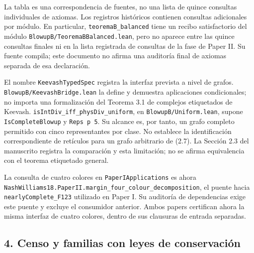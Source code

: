 \documentclass[spanish,11pt,a4paper]{article}
\begin{document}
La tabla es una correspondencia de fuentes, no una lista de quince consultas individuales de axiomas. Los registros históricos contienen consultas adicionales por módulo. En particular, \texttt{teorema\allowbreak{}B\_\allowbreak{}bal\allowbreak{}anced} tiene un recibo satisfactorio del módulo \texttt{Blowup\allowbreak{}B/\allowbreak{}Teor\allowbreak{}ema\allowbreak{}BBalanced\allowbreak{}.\allowbreak{}lean}, pero no aparece entre las quince consultas finales ni en la lista registrada de consultas de la fase de Paper II. Su fuente compila; este documento no afirma una auditoría final de axiomas separada de esa declaración.

El nombre \texttt{Keevash\allowbreak{}Typed\allowbreak{}\allowbreak{}Spec} registra la interfaz prevista a nivel de grafos. \texttt{Blowup\allowbreak{}B/\allowbreak{}Keev\allowbreak{}ash\allowbreak{}Bridge.\allowbreak{}le\allowbreak{}an} la define y demuestra aplicaciones condicionales; no importa una formalización del Teorema 3.1 de complejos etiquetados de Keevash. \texttt{is\allowbreak{}Int\allowbreak{}Div\_\allowbreak{}iff\allowbreak{}\_\allowbreak{}phys\allowbreak{}Div\_\allowbreak{}uni\allowbreak{}form}, en \texttt{Blowup\allowbreak{}B/\allowbreak{}Unif\allowbreak{}orm.\allowbreak{}lean}, supone \texttt{Is\allowbreak{}Complete\allowbreak{}Bl\allowbreak{}owup} y \texttt{Reps p 5}. Su alcance es, por tanto, un grafo completo permitido con cinco representantes por clase. No establece la identificación correspondiente de retículos para un grafo arbitrario de (2.7). La Sección 2.3 del manuscrito registra la comparación y esta limitación; no se afirma equivalencia con el teorema etiquetado general.

La consulta de cuatro colores en \texttt{Paper\allowbreak{}IApplic\allowbreak{}ations} es ahora \texttt{Nash\allowbreak{}Williams\allowbreak{}18.\allowbreak{}Paper\allowbreak{}II.\allowbreak{}m\allowbreak{}argin\_\allowbreak{}four\_\allowbreak{}c\allowbreak{}olour\_\allowbreak{}decomp\allowbreak{}osition}, el puente hacia \texttt{nearly\allowbreak{}Comple\allowbreak{}te\_\allowbreak{}F123} utilizado en Paper I. Su auditoría de dependencias exige este puente y excluye el consumidor anterior. Ambos papers certifican ahora la misma interfaz de cuatro colores, dentro de sus clausuras de entrada separadas.


\subsection{4. Censo y familias con leyes de conservación}\label{censo-y-familias-con-leyes-de-conservaciuxf3n}
\end{document}
